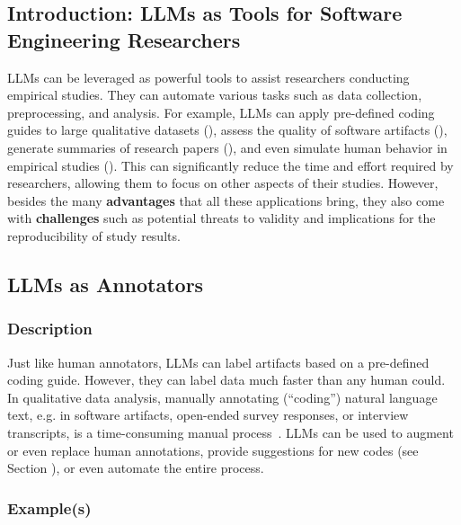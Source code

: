 



\subsection{Introduction: LLMs as Tools for Software Engineering Researchers}
\label{sec:llms-as-tools-for-software-engineering-researchers}

LLMs can be leveraged as powerful tools to assist researchers conducting empirical studies.
They can automate various tasks such as data collection, preprocessing, and analysis.
For example, LLMs can apply pre-defined coding guides to large qualitative datasets (\annotators), assess the quality of software artifacts (\judges), generate summaries of research papers (\synthesis), and even simulate human behavior in empirical studies (\subjects).
This can significantly reduce the time and effort required by researchers, allowing them to focus on other aspects of their studies.
However, besides the many \textbf{advantages} that all these applications bring, they also come with \textbf{challenges} such as potential threats to validity and implications for the reproducibility of study results.

\subsection{LLMs as Annotators}
\label{sec:llms-as-annotators}

\subsubsection{Description}

Just like human annotators, LLMs can label artifacts based on a pre-defined coding guide.
However, they can label data much faster than any human could. 
In qualitative data analysis, manually annotating (``coding'') natural language text, e.g. in software artifacts, open-ended survey responses, or interview transcripts, is a time-consuming manual process~\cite{DBLP:journals/ase/BanoHZT24}.
LLMs can be used to augment or even replace human annotations, provide suggestions for new codes (see Section \synthesis), or even automate the entire process.

\subsubsection{Example(s)}

